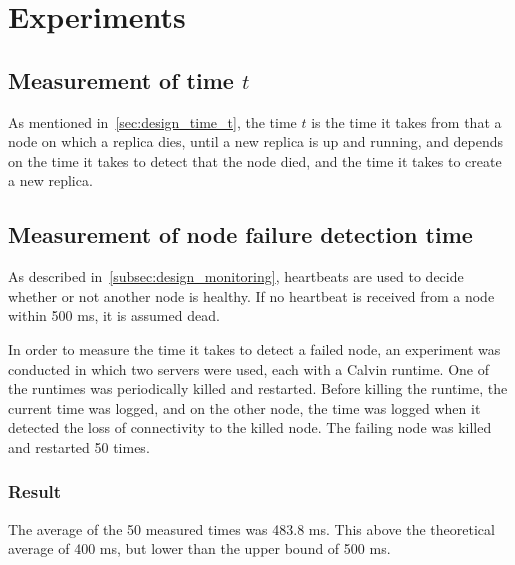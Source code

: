 \documentclass{cslthse-msc}
\begin{document}

\section{Experiments}

\subsection{Measurement of time $t$} \label{sec:eval_time_t}
As mentioned in~\cref{sec:design_time_t}, the time $t$ is the time it takes from that a node on which a replica dies, until a new replica is up and running, and depends on the time it takes to detect that the node died, and the time it takes to create a new replica.

\subsection{Measurement of node failure detection time} \label{subsec:eval_node_fail_time}
As described in~\cref{subsec:design_monitoring}, heartbeats are used to decide whether or not another node is healthy. If no heartbeat is received from a node within 500 ms, it is assumed dead. 

In order to measure the time it takes to detect a failed node, an experiment was conducted in which two servers were used, each with a Calvin runtime. One of the runtimes was periodically killed and restarted. Before killing the runtime, the current time was logged, and on the other node, the time was logged when it detected the loss of connectivity to the killed node. The failing node was killed and restarted 50 times.

\subsubsection*{Result}
The average of the 50 measured times was 483.8 ms. This above the theoretical average of 400 ms, but lower than the upper bound of 500 ms.

\end{document}
